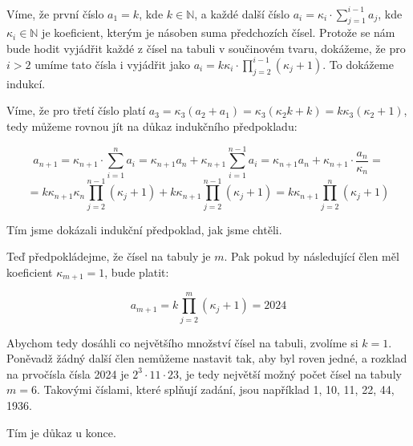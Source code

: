 \documentclass{fkssolpub}
\author{Ondřej Sedláček}
\begin{document}
Víme, že první číslo $a_1 = k$, kde $k \in \mathbb{N}$, a každé další číslo $a_i = \kappa_i \cdot \sum_{j = 1}^{i - 1} a_j$, kde $\kappa_i \in \mathbb{N}$ je koeficient, kterým je násoben suma předchozích čísel. Protože se nám bude hodit vyjádřit každé z čísel na tabuli v součinovém tvaru, dokážeme, že pro $i > 2$ umíme tato čísla i vyjádřit jako $a_i = k \kappa_i \cdot \prod_{j = 2}^{i - 1} (\kappa_j + 1)$. To dokážeme indukcí.

Víme, že pro třetí číslo platí $a_3 = \kappa_3 (a_2 + a_1) = \kappa_3 (\kappa_2 k + k) = k \kappa_3 (\kappa_2 + 1)$, tedy můžeme rovnou jít na důkaz indukčního předpokladu:

\[
	a_{n + 1} = \kappa_{n + 1} \cdot \sum_{i = 1}^{n} a_i = \kappa_{n + 1} a_{n} + \kappa_{n+1} \sum_{i = 1}^{n - 1} a_i = \kappa_{n + 1} a_{n} + \kappa_{n + 1} \cdot \frac{a_{n}}{\kappa_{n}} =
\]
\[
	= k \kappa_{n + 1} \kappa_{n} \prod_{j = 2}^{n - 1} (\kappa_j + 1) + k \kappa_{n + 1} \prod_{j = 2}^{n - 1} (\kappa_j + 1) = k \kappa_{n + 1} \prod_{j = 2}^{n} (\kappa_j + 1)
\]

Tím jsme dokázali indukční předpoklad, jak jsme chtěli.

Teď předpokládejme, že čísel na tabuly je $m$. Pak pokud by následující člen měl koeficient $\kappa_{m + 1} = 1$, bude platit:

\[
	a_{m + 1} = k \prod_{j = 2}^{m} (\kappa_j + 1) = 2024
\]

Abychom tedy dosáhli co největšího množství čísel na tabuli, zvolíme si $k = 1$. Poněvadž žádný další člen nemůžeme nastavit tak, aby byl roven jedné, a rozklad na prvočísla čísla 2024 je $2^3 \cdot 11 \cdot 23$, je tedy největší možný počet čísel na tabuly $m = 6$. Takovými číslami, které splňují zadání, jsou například 1, 10, 11, 22, 44, 1936.

Tím je důkaz u konce.
\end{document}
